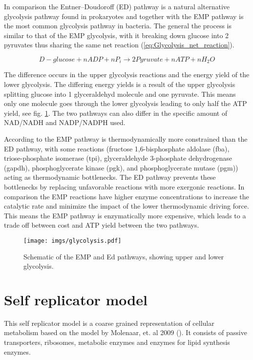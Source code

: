 In comparison the Entner–Doudoroff (ED) pathway is a natural alternative glycolysis pathway found in prokaryotes and together with the EMP pathway is the most common glycolysis pathway in bacteria. The general the process is similar to that of the EMP glycolysis, with it breaking down glucose into 2 pyruvates thus sharing the same net reaction (\ref{eq:Glycolysis_net_reaction}).

\begin{equation}
    D-glucose + n ADP + n P_i \rightarrow 2 Pyruvate + n ATP + n H_2O
    \label{eq:Glycolysis_net_reaction}
\end{equation}

The difference occurs in the upper glycolysis reactions and the energy yield of the lower glycolysis. The differing energy yields is a result of the upper glycolysis splitting glucose into 1 glyceraldehyd molecule and one pyruvate. This means only one molecule goes through the lower glycolysis leading to only half the ATP yield, see fig. \ref{fig:glycolysis_scheme}. 
The two pathways can also differ in the specific amount of NAD/NADH and NADP/NADPH used.

According to \cite{flamholz2012glycotic} the EMP pathway is thermodynamically more constrained than the ED pathway, with some reactions (fructose 1,6-bisphosphate aldolase (fba), triose-phosphate isomerase (tpi), glyceraldehyde 3-phosphate dehydrogenase (gapdh), phosphoglycerate kinase (pgk), and phosphoglycerate mutase (pgm)) acting as thermodynamic bottlenecks. The ED pathway prevents these bottlenecks by replacing unfavorable reactions with more exergonic reactions.
In comparison the EMP reactions have higher enzyme concentrations to increase the catalytic rate and minimize the impact of the lower thermodynamic driving force. This means the EMP pathway is enzymatically more expensive, which leads to a trade off between cost and ATP yield between the two pathways. 

\begin{figure}[H]
    \centering
    \texttt{[image: imgs/glycolysis.pdf]}
    \caption{Schematic of the EMP and Ed pathways, showing upper and lower glycolysis.}
    \label{fig:glycolysis_scheme}
\end{figure}

\section{Self replicator model}
This self replicator model is a coarse grained representation of cellular metabolism based on the model by Molenaar, et. al 2009 (\cite{molenaar2009shifts}). It consists of passive transporters, ribosomes, metabolic enzymes and enzymes for lipid synthesis enzymes. 

